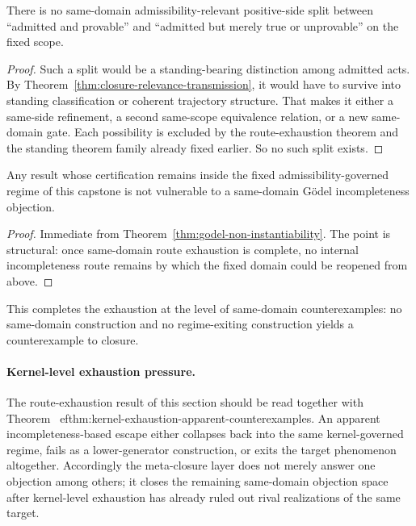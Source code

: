 \begin{corollary}
There is no same-domain admissibility-relevant positive-side split between ``admitted and provable'' and ``admitted but merely true or unprovable'' on the fixed scope.
\end{corollary}

\begin{proof}
Such a split would be a standing-bearing distinction among admitted acts. By Theorem~\ref{thm:closure-relevance-transmission}, it would have to survive into standing classification or coherent trajectory structure. That makes it either a same-side refinement, a second same-scope equivalence relation, or a new same-domain gate. Each possibility is excluded by the route-exhaustion theorem and the standing theorem family already fixed earlier. So no such split exists.
\end{proof}

\begin{corollary}
Any result whose certification remains inside the fixed admissibility-governed regime of this capstone is not vulnerable to a same-domain G\"odel incompleteness objection.
\end{corollary}

\begin{proof}
Immediate from Theorem~\ref{thm:godel-non-instantiability}. The point is structural: once same-domain route exhaustion is complete, no internal incompleteness route remains by which the fixed domain could be reopened from above.
\end{proof}

This completes the exhaustion at the level of same-domain counterexamples: no same-domain construction and no regime-exiting construction yields a counterexample to closure.

\paragraph{Kernel-level exhaustion pressure.} The route-exhaustion result of this section should be read together with Theorem~
ef{thm:kernel-exhaustion-apparent-counterexamples}. An apparent incompleteness-based escape either collapses back into the same kernel-governed regime, fails as a lower-generator construction, or exits the target phenomenon altogether. Accordingly the meta-closure layer does not merely answer one objection among others; it closes the remaining same-domain objection space after kernel-level exhaustion has already ruled out rival realizations of the same target.
